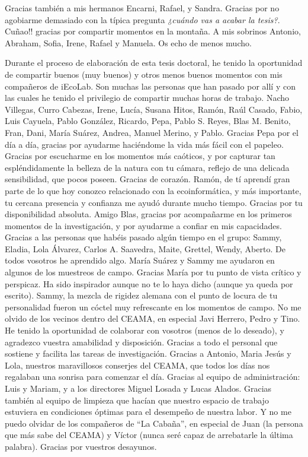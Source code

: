 Gracias también a mis hermanos Encarni, Rafael, y Sandra. Gracias por no agobiarme demasiado con la típica pregunta \emph{¿cuándo vas a acabar la tesis?}. Cuñao!! gracias por compartir momentos en la montaña. A mis sobrinos Antonio, Abraham, Sofia, Irene, Rafael y Manuela. Os echo de menos mucho. 


Durante el proceso de elaboración de esta tesis doctoral, he tenido la oportunidad de compartir buenos (muy buenos) y otros menos buenos momentos con mis compañeros de iEcoLab. Son muchas las personas que han pasado por allí y con las cuales he tenido el privilegio de compartir muchas horas de trabajo. Nacho Villegas, Curro Cabezas, Irene, Lucía, Susana Hitos, Ramón, Raúl Casado, Fabio, Luis Cayuela, Pablo González, Ricardo, Pepa, Pablo S. Reyes, Blas M. Benito, Fran, Dani, María Suárez, Andrea, Manuel Merino, y Pablo. Gracias Pepa por el día a día, gracias por ayudarme haciéndome la vida más fácil con el papeleo. Gracias por escucharme en los momentos más caóticos, y por capturar tan espléndidamente la belleza de la natura con tu cámara, reflejo de una delicada sensibilidad, que pocos poseen. Gracias de corazón. Ramón, de tí aprendí gran parte de lo que hoy conozco relacionado con la ecoinformática, y más importante, tu cercana presencia y confianza me ayudó durante mucho tiempo. Gracias por tu disponibilidad absoluta. Amigo Blas, gracias por acompañarme en los primeros momentos de la investigación, y por ayudarme a confiar en mis capacidades. Gracias a las personas que habéis pasado algún tiempo en el grupo: Sammy, Eladia, Lola Álvarez, Carlos A. Saavedra, Maite, Grettel, Wendy, Aberto. De todos vosotros he aprendido algo. María Suárez y Sammy me ayudaron en algunos de los muestreos de campo. Gracias María por tu punto de vista crítico y perspicaz. Ha sido inspirador aunque no te lo haya dicho (aunque ya queda por escrito). Sammy, la mezcla de rigidez alemana con el punto de locura de tu personalidad fueron un cóctel muy refrescante en los momentos de campo. No me olvido de los vecinos dentro del CEAMA, en especial Javi Herrero, Pedro y Tino. He tenido la oportunidad de colaborar con vosotros (menos de lo deseado), y agradezco vuestra amabilidad y disposición. Gracias a todo el personal que sostiene y facilita las tareas de investigación. Gracias a Antonio, Maria Jesús y Lola, nuestros maravillosos conserjes del CEAMA, que todos los días nos regalaban una sonrisa para comenzar el día. Gracias al equipo de administración: Luis y Mariam, y a los directores Miguel Losada y Lucas Alados. Gracias también al equipo de limpieza que hacían que nuestro espacio de trabajo estuviera en condiciones óptimas para el desempeño de nuestra labor. Y no me puedo olvidar de los compañeros de “La Cabaña”, en especial de Juan (la persona que más sabe del CEAMA) y Víctor (nunca seré capaz de arrebatarle la última palabra). Gracias por vuestros desayunos. 

